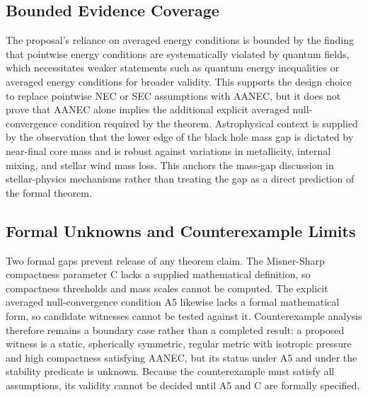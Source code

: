 \documentclass[conference]{IEEEtran}
\begin{document}
\subsection{Bounded Evidence Coverage}
The proposal's reliance on averaged energy conditions is bounded by the finding that pointwise energy conditions are systematically violated by quantum fields, which necessitates weaker statements such as quantum energy inequalities or averaged energy conditions for broader validity. This supports the design choice to replace pointwise NEC or SEC assumptions with AANEC, but it does not prove that AANEC alone implies the additional explicit averaged null-convergence condition required by the theorem. Astrophysical context is supplied by the observation that the lower edge of the black hole mass gap is dictated by near-final core mass and is robust against variations in metallicity, internal mixing, and stellar wind mass loss. This anchors the mass-gap discussion in stellar-physics mechanisms rather than treating the gap as a direct prediction of the formal theorem.~\cite{cite_0ed84243cf171bc4,cite_7a407c865faafd11}

\subsection{Formal Unknowns and Counterexample Limits}
Two formal gaps prevent release of any theorem claim. The Misner-Sharp compactness parameter C lacks a supplied mathematical definition, so compactness thresholds and mass scales cannot be computed. The explicit averaged null-convergence condition A5 likewise lacks a formal mathematical form, so candidate witnesses cannot be tested against it. Counterexample analysis therefore remains a boundary case rather than a completed result: a proposed witness is a static, spherically symmetric, regular metric with isotropic pressure and high compactness satisfying AANEC, but its status under A5 and under the stability predicate is unknown. Because the counterexample must satisfy all assumptions, its validity cannot be decided until A5 and C are formally specified.
\end{document}
